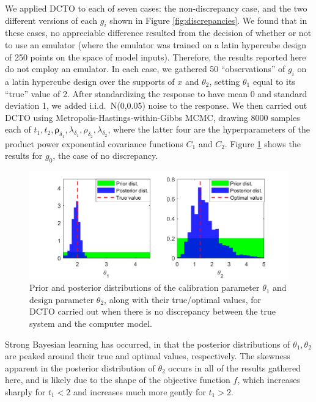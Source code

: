 \documentclass[12pt]{article}
\begin{document}
%
We applied DCTO to each of seven cases: the non-discrepancy case, and the two different versions of each $g_i$ shown in Figure \ref{fig:discrepancies}.
%
We found that in these cases, no appreciable difference resulted from the decision of whether or not to use an emulator (where the emulator was trained on a latin hypercube design of 250 points on the space of model inputs).
%
Therefore, the results reported here do not employ an emulator.
%
In each case, we gathered 50 ``observations'' of $g_i$ on a latin hypercube design over the supports of $x$ and $\theta_2$, setting $\theta_1$ equal to its ``true'' value of 2.
%
After standardizing the response to have mean 0 and standard deviation 1, we added i.i.d.\ N(0,0.05) noise to the response.
%
We then carried out DCTO using Metropolis-Hastings-within-Gibbs MCMC, drawing 8000 samples each of $t_1,t_2,\boldsymbol\rho_{\delta_1},\lambda_{\delta_1},\rho_{\delta_2},\lambda_{\delta_2}$, where the latter four are the hyperparameters of the product power exponential covariance functions $C_1$ and $C_2$.
%
Figure \ref{fig:no_discrep_results} shows the results for $g_0$, the case of no discrepancy.
%
\begin{figure}
\centering
\includegraphics[scale=0.85]{FIG_discrepancy0_results}
\captionsetup{width=.85\linewidth}
\caption{Prior and posterior distributions of the calibration parameter $\theta_1$ and design parameter $\theta_2$, along with their true/optimal values, for DCTO carried out when there is no discrepancy between the true system and the computer model.}
\label{fig:no_discrep_results}
\end{figure}
%
Strong Bayesian learning has occurred, in that the posterior distributions of $\theta_1,\theta_2$ are peaked around their true and optimal values, respectively.
%
The skewness apparent in the posterior distribution of $\theta_2$ occurs in all of the results gathered here, and is likely due to the shape of the objective function $f$, which increases sharply for $t_1<2$ and increases much more gently for $t_1>2$.
%
\end{document}
